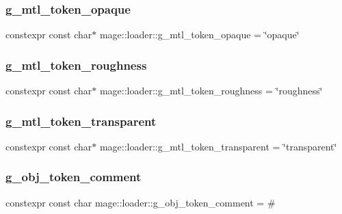 \subsubsection{\texorpdfstring{g\+\_\+mtl\+\_\+token\+\_\+opaque}{g\_mtl\_token\_opaque}}
{\footnotesize\ttfamily constexpr const char$\ast$ mage\+::loader\+::g\+\_\+mtl\+\_\+token\+\_\+opaque = \char`\"{}opaque\char`\"{}}

\hypertarget{namespacemage_1_1loader_ad803f71d9fcac6672c8ffd56a79fff5a}{}\label{namespacemage_1_1loader_ad803f71d9fcac6672c8ffd56a79fff5a} 
\subsubsection{\texorpdfstring{g\+\_\+mtl\+\_\+token\+\_\+roughness}{g\_mtl\_token\_roughness}}
{\footnotesize\ttfamily constexpr const char$\ast$ mage\+::loader\+::g\+\_\+mtl\+\_\+token\+\_\+roughness = \char`\"{}roughness\char`\"{}}

\hypertarget{namespacemage_1_1loader_af328cadb53f7ba567563476be1cea61d}{}\label{namespacemage_1_1loader_af328cadb53f7ba567563476be1cea61d} 
\subsubsection{\texorpdfstring{g\+\_\+mtl\+\_\+token\+\_\+transparent}{g\_mtl\_token\_transparent}}
{\footnotesize\ttfamily constexpr const char$\ast$ mage\+::loader\+::g\+\_\+mtl\+\_\+token\+\_\+transparent = \char`\"{}transparent\char`\"{}}

\hypertarget{namespacemage_1_1loader_ac9175350a1b432a09495d56ef1a8a18e}{}\label{namespacemage_1_1loader_ac9175350a1b432a09495d56ef1a8a18e} 
\subsubsection{\texorpdfstring{g\+\_\+obj\+\_\+token\+\_\+comment}{g\_obj\_token\_comment}}
{\footnotesize\ttfamily constexpr const char mage\+::loader\+::g\+\_\+obj\+\_\+token\+\_\+comment = \textquotesingle{}\#\textquotesingle{}}


